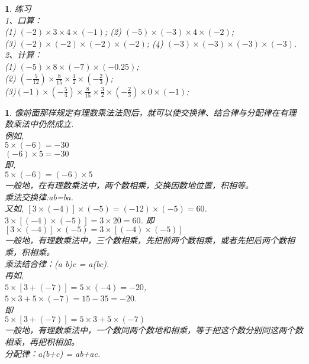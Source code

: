 \documentclass[11pt]{article}
\newtheorem{exercise}{ }
\newtheorem{nature}{ }
\begin{document}
\begin{exercise}
练习\\
1、口算：\\
(1) $(-2) \times 3 \times 4 \times (-1)$;  (2) $(-5) \times (-3) \times 4 \times (-2)$;\\
(3) $(-2) \times (-2) \times (-2) \times (-2)$;  (4) $(-3) \times (-3) \times (-3) \times (-3)$.\\

2、计算：\\
(1) $(-5) \times 8 \times (-7) \times (-0.25)$;\\
(2) $ (-\frac{5}{12}) \times \frac{8}{15} \times \frac{1}{2} \times (-\frac{2}{3}) $;\\
(3)$ (-1) \times (-\frac{5}{4}) \times \frac{8}{15} \times \frac{3}{2} \times (-\frac{2}{3}) \times 0 \times (-1) $;\\
\end{exercise}
\begin{nature}
    像前面那样规定有理数乘法法则后，就可以使交换律、结合律与分配律在有理数乘法中仍然成立.\\
    例如,\\
        $ 5\times(-6)=-30 $\\
        $ (-6)\times 5 = -30 $\\
    即,\\
        $ 5\times (-6) = (-6) \times 5 $\\
    一般地，在有理数乘法中，两个数相乘，交换因数地位置，积相等。\\
        乘法交换律:ab=ba.\\
        又如,     $ [3\times (-4)] \times (-5) = (-12) \times (-5) = 60$.\\
        $ 3\times [(-4) \times (-5)] = 3 \times 20 = 60 $.
        即\\
       $ [3\times (-4)] \times (-5) =3\times [(-4) \times (-5)]$\\
        一般地，有理数乘法中，三个数相乘，先把前两个数相乘，或者先把后两个数相乘，积相乘。\\
            乘法结合律：(a b)c = a(bc).\\
        再如,\\
          $  5 \times [3+(-7)] = 5 \times (-4) = -20$, \\
          $  5 \times 3+5\times(-7) = 15-35 = -20 $.\\
        即\\
            $ 5 \times [3+(-7)] = 5 \times 3+5\times(-7)$\\
        一般地，有理数乘法中，一个数同两个数地和相乘，等于把这个数分别同这两个数相乘，再把积相加。\\
            分配律：a(b+c) = ab+ac.\\
\end{nature}
\end{document}
